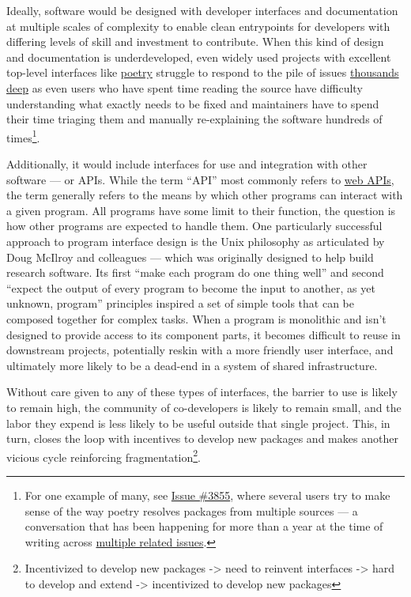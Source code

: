 Ideally, software would be designed with developer interfaces and
documentation at multiple scales of complexity to enable clean
entrypoints for developers with differing levels of skill and investment
to contribute. When this kind of design and documentation is
underdeveloped, even widely used projects with excellent top-level
interfaces like \href{https://python-poetry.org/}{poetry} struggle to
respond to the pile of issues
\href{https://github.com/python-poetry/poetry/issues}{thousands deep} as
even users who have spent time reading the source have difficulty
understanding what exactly needs to be fixed and maintainers have to
spend their time triaging them and manually re-explaining the software
hundreds of times\footnote{For one example of many, see
  \href{https://github.com/python-poetry/poetry/issues/3855}{Issue
  \#3855}, where several users try to make sense of the way poetry
  resolves packages from multiple sources --- a conversation that has
  been happening for more than a year at the time of writing across
  \href{https://github.com/python-poetry/poetry/discussions/4137\#discussioncomment-2320644}{multiple
  related issues}.}.

Additionally, it would include interfaces for use and integration with
other software --- or APIs. While the term ``API'' most commonly refers
to \href{https://en.wikipedia.org/wiki/Web_API}{web APIs}, the term
generally refers to the means by which other programs can interact with
a given program. All programs have some limit to their function, the
question is how other programs are expected to handle them. One
particularly successful approach to program interface design is the Unix
philosophy as articulated by Doug McIlroy and colleagues \citep{mcilroyUNIXTimeSharingSystem1978}  --- which was originally designed
to help build research software. Its first ``make each program do one
thing well'' and second ``expect the output of every program to become
the input to another, as yet unknown, program'' principles inspired a
set of simple tools that can be composed together for complex tasks.
When a program is monolithic and isn't designed to provide access to its
component parts, it becomes difficult to reuse in downstream projects,
potentially reskin with a more friendly user interface, and ultimately
more likely to be a dead-end in a system of shared infrastructure.

Without care given to any of these types of interfaces, the barrier to
use is likely to remain high, the community of co-developers is likely
to remain small, and the labor they expend is less likely to be useful
outside that single project. This, in turn, closes the loop with
incentives to develop new packages and makes another vicious cycle
reinforcing fragmentation\footnote{Incentivized to develop new packages
  -\textgreater{} need to reinvent interfaces -\textgreater{} hard to
  develop and extend -\textgreater{} incentivized to develop new
  packages}.

